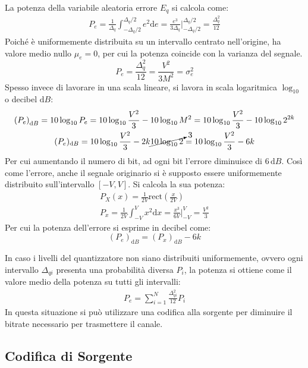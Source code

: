 \documentclass{article}
\newcommand{\rect}{\mathrm{rect}}
\newcommand{\df}{\mathrm{d}}
\numberwithin{equation}{subsection}
\begin{document}
La potenza della variabile aleatoria errore $E_q$ si calcola come:
\begin{gather*}
    {P}_e=\displaystyle\frac{1}{\Delta_q}\int_{-\Delta_q /2}^{\Delta_q/2}e^2\df e=\frac{e^3}{3\Delta_q}\Bigg|_{-\Delta_q/2}^{\Delta_q/2}=\frac{\Delta_q^2}{12}
\end{gather*}
Poiché è uniformemente distribuita su un intervallo centrato nell'origine, ha valore medio nullo $\mu_e=0$, per cui la potenza coincide con la 
varianza del segnale. 
\begin{equation}
    P_e=\displaystyle\frac{\Delta_q^2}{12}=\frac{V^2}{3M^2}=\sigma_e^2
\end{equation}
Spesso invece di lavorare in una scala lineare, si lavora in scala logaritmica $\log_{10}$ o decibel $\df B$:
\begin{gather*}
    \left(P_e\right)_{\df B}=10\log_{10}P_e=10\log_{10}\displaystyle\frac{V^2}{3}-10\log_{10}M^2=10\log_{10}\displaystyle\frac{V^2}{3}-10\log_{10}2^{2k}\\
    (P_e)_{\df B}=10\log_{10}\displaystyle\frac{V^2}{3}-2k\cancelto{3}{10\log_{10}2}=10\log_{10}\displaystyle\frac{V^2}{3}-6k
\end{gather*}
Per cui aumentando il numero di bit, ad ogni bit l'errore diminuisce di $6\,\df B$. Così come l'errore, anche il 
segnale originario si è supposto essere uniformemente distribuito sull'intervallo $[-V,V]$. Si calcola la sua potenza:
\begin{gather*}
    P_X(x)=\displaystyle\frac{1}{2V}\rect\left(\frac{x}{2V}\right)\\
    P_x=\displaystyle\frac{1}{2V}\int_{-V}^{V}x^2\df x=\frac{x^3}{6V}\Bigg|_{-V}^V=\frac{V^2}{3}
\end{gather*}
Per cui la potenza dell'errore si esprime in decibel come:
\begin{equation}
    (P_e)_{\df B}=(P_x)_{\df B}-6k
\end{equation}


In caso i livelli del quantizzatore non siano distribuiti uniformemente, ovvero ogni intervallo $\Delta_{qi}$ presenta una probabilità diversa $P_i$, la potenza si ottiene 
come il valore medio della potenza su tutti gli intervalli:
\begin{gather*}
    P_e=\displaystyle\sum_{i=1}^N\frac{\Delta_{qi}^2}{12}P_i
\end{gather*}
In questa situazione si può utilizzare una codifica alla sorgente per diminuire il bitrate necessario per trasmettere il canale. 

\subsection{Codifica di Sorgente}
\end{document}
